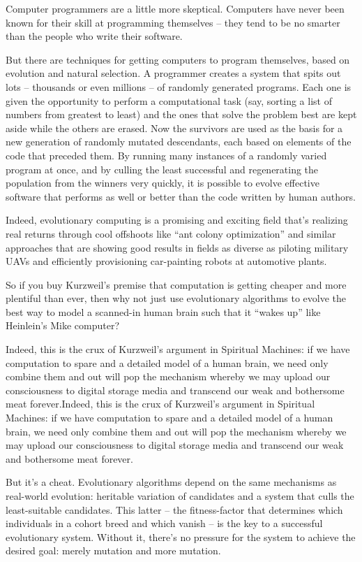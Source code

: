 Computer programmers are a little more skeptical. Computers have
never been known for their skill at programming themselves -- they
tend to be no smarter than the people who write their software.

But there are techniques for getting computers to program
themselves, based on evolution and natural selection. A programmer
creates a system that spits out lots -- thousands or even millions
-- of randomly generated programs. Each one is given the
opportunity to perform a computational task (say, sorting a list of
numbers from greatest to least) and the ones that solve the problem
best are kept aside while the others are erased. Now the survivors
are used as the basis for a new generation of randomly mutated
descendants, each based on elements of the code that preceded them.
By running many instances of a randomly varied program at once, and
by culling the least successful and regenerating the population
from the winners very quickly, it is possible to evolve effective
software that performs as well or better than the code written by
human authors.

Indeed, evolutionary computing is a promising and exciting field
that's realizing real returns through cool offshoots like ``ant
colony optimization'' and similar approaches that are showing good
results in fields as diverse as piloting military UAVs and
efficiently provisioning car-painting robots at automotive plants.

So if you buy Kurzweil's premise that computation is getting
cheaper and more plentiful than ever, then why not just use
evolutionary algorithms to evolve the best way to model a
scanned-in human brain such that it ``wakes up'' like Heinlein's Mike
computer?

Indeed, this is the crux of Kurzweil's argument in Spiritual
Machines: if we have computation to spare and a detailed model of a
human brain, we need only combine them and out will pop the
mechanism whereby we may upload our consciousness to digital
storage media and transcend our weak and bothersome meat
forever.Indeed, this is the crux of Kurzweil's argument in
Spiritual Machines: if we have computation to spare and a detailed
model of a human brain, we need only combine them and out will pop
the mechanism whereby we may upload our consciousness to digital
storage media and transcend our weak and bothersome meat forever.

But it's a cheat. Evolutionary algorithms depend on the same
mechanisms as real-world evolution: heritable variation of
candidates and a system that culls the least-suitable candidates.
This latter -- the fitness-factor that determines which individuals
in a cohort breed and which vanish -- is the key to a successful
evolutionary system. Without it, there's no pressure for the system
to achieve the desired goal: merely mutation and more mutation.

